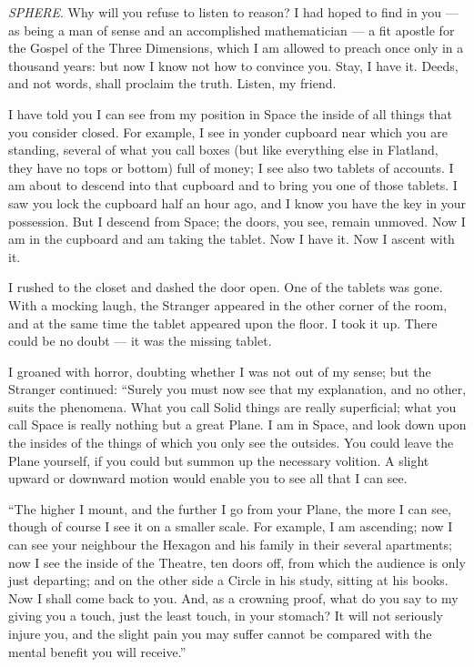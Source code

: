 \documentclass[10pt, kindle, oneside]{kindle}
\begin{document}
\emph{SPHERE}. Why will you refuse to listen to reason? I had hoped to find in you ---
as being a man of sense and an accomplished mathematician --- a fit apostle for
the Gospel of the Three Dimensions, which I am allowed to preach once only in
a thousand years: but now I know not how to convince you. Stay, I have it.
Deeds, and not words, shall proclaim the truth. Listen, my friend.

I have told you I can see from my position in Space the inside of all things
that you consider closed. For example, I see in yonder cupboard near which you
are standing, several of what you call boxes (but like everything else in
Flatland, they have no tops or bottom) full of money; I see also two tablets
of accounts. I am about to descend into that cupboard and to bring you one of
those tablets. I saw you lock the cupboard half an hour ago, and I know you
have the key in your possession. But I descend from Space; the doors, you see,
remain unmoved. Now I am in the cupboard and am taking the tablet. Now I have
it. Now I ascent with it.

I rushed to the closet and dashed the door open. One of the tablets was gone.
With a mocking laugh, the Stranger appeared in the other corner of the room,
and at the same time the tablet appeared upon the floor. I took it up. There
could be no doubt --- it was the missing tablet.

I groaned with horror, doubting whether I was not out of my sense; but the
Stranger continued: ``Surely you must now see that my explanation, and no
other, suits the phenomena. What you call Solid things are really superficial;
what you call Space is really nothing but a great Plane. I am in Space, and
look down upon the insides of the things of which you only see the outsides.
You could leave the Plane yourself, if you could but summon up the necessary
volition. A slight upward or downward motion would enable you to see all that
I can see.

``The higher I mount, and the further I go from your Plane, the more I can see,
though of course I see it on a smaller scale. For example, I am ascending; now
I can see your neighbour the Hexagon and his family in their several
apartments; now I see the inside of the Theatre, ten doors off, from which the
audience is only just departing; and on the other side a Circle in his study,
sitting at his books. Now I shall come back to you. And, as a crowning proof,
what do you say to my giving you a touch, just the least touch, in your
stomach? It will not seriously injure you, and the slight pain you may suffer
cannot be compared with the mental benefit you will receive.''
\end{document}
